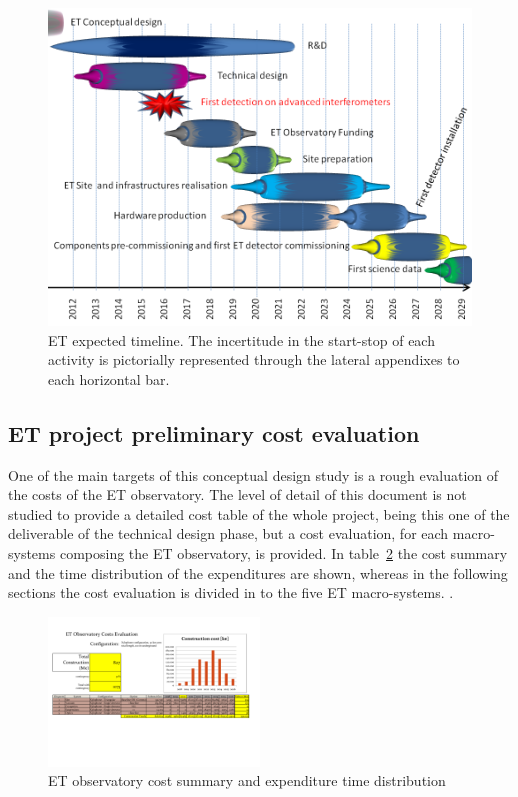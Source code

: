 \begin{figure}[hthp!]
\includegraphics[width=1.0\textwidth]{Sec_Conclusions/ET-roadmap.png}
\caption{ET expected timeline. The incertitude in the start-stop of each activity is pictorially represented through the lateral appendixes to each horizontal bar.}
\label{Fig:ET-Roadmap}       %
\end{figure}
%
%
\subsection[ET costs]{ET project preliminary cost evaluation}
%  
\label{ConclusionsCostsSubSection}
%
One of the main targets of this conceptual design study is a rough evaluation of the costs of the ET observatory. The level of detail of this document is not studied to provide a detailed cost table of the whole project, being this one of the deliverable of the technical design phase, but a cost evaluation, for each macro-systems composing the ET observatory, is provided. 
%
In table~\ref{Fig:TotalCostTable} the cost summary and the time distribution of the expenditures are shown, whereas in the following sections the cost evaluation is divided in to the five ET macro-systems. .
%
\FloatBarrier
\begin{figure}[hthp!]
\centering 
\includegraphics[angle=90, width=0.5\textwidth]{Sec_Conclusions/ET-cost-v00r05-Total.pdf}
%
\caption{ET observatory cost summary and expenditure time distribution}
\label{Fig:TotalCostTable}
\end{figure}
%
%
%
